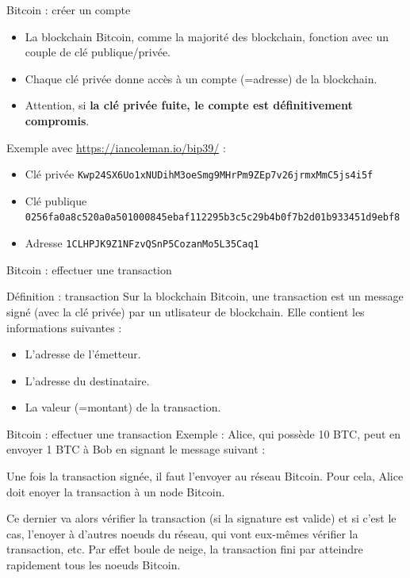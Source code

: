 \begin{frame}{Bitcoin : créer un compte}
  \begin{itemize}
    \item La blockchain Bitcoin, comme la majorité des blockchain, fonction avec un couple de clé publique/privée.
    \item Chaque clé privée donne accès à un compte (=adresse) de la blockchain.
    \item Attention, si \textbf{la clé privée fuite, le compte est définitivement compromis}.
  \end{itemize}

  Exemple avec \url{https://iancoleman.io/bip39/} :

  \begin{itemize}
    \item Clé privée \texttt{Kwp24SX6Uo1xNUDihM3oeSmg9MHrPm9ZEp7v26jrmxMmC5js4i5f}
    \item Clé publique \texttt{0256fa0a8c520a0a501000845ebaf112295b3c5c29b4b0f7b2d01b933451d9ebf8}
    \item Adresse \texttt{1CLHPJK9Z1NFzvQSnP5CozanMo5L35Caq1}
  \end{itemize}
\end{frame}

\begin{frame}{Bitcoin : effectuer une transaction}
  \begin{block}{Définition : transaction}
    Sur la blockchain Bitcoin, une transaction est un message signé (avec la clé privée) par un utlisateur de blockchain.
    Elle contient les informations suivantes :

    \begin{itemize}
      \item L'adresse de l'émetteur.
      \item L'adresse du destinataire.
      \item La valeur (=montant) de la transaction.
    \end{itemize}
  \end{block}
\end{frame}

\begin{frame}{Bitcoin : effectuer une transaction}
  Exemple : Alice, qui possède 10 BTC, peut en envoyer 1 BTC à Bob en signant le message suivant :

  Une fois la transaction signée, il faut l'envoyer au réseau Bitcoin.
  Pour cela, Alice doit enoyer la transaction à un node Bitcoin.

  Ce dernier va alors vérifier la transaction (si la signature est valide) et si c'est le cas, l'enoyer à d'autres noeuds du réseau, qui vont eux-mêmes vérifier la transaction, etc.
  Par effet boule de neige, la transaction fini par atteindre rapidement tous les noeuds Bitcoin.
\end{frame}

